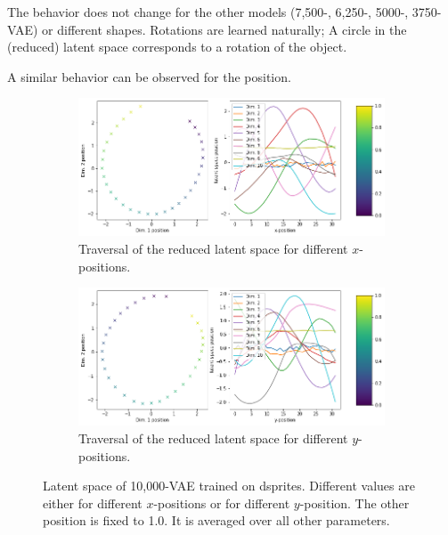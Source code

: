 The behavior does not change for the other models (7,500-, 6,250-, 5000-, 3750-\ac{VAE}) or different shapes.
Rotations are learned naturally;
A circle in the (reduced) latent space corresponds to a rotation of the object.

A similar behavior can be observed for the position.
\begin{figure}
    \centering
    \begin{subfigure}{.48\textwidth}
        \includegraphics[width=\textwidth]{images/latent_space_traversals/vae_10000_dsprites_latent_space_values_x_position.png}
        \caption{Traversal of the reduced latent space for different $x$-positions.}
        \label{subfig:vae_dsprites_x_pos_latent_space_route}
    \end{subfigure}
    \begin{subfigure}{.48\textwidth}
        \includegraphics[width=\textwidth]{images/latent_space_traversals/vae_10000_dsprites_latent_space_values_y_position.png}
        \caption{Traversal of the reduced latent space for different $y$-positions.}
        \label{subfig:vae_dsprites_y_pos_latent_space_route}
    \end{subfigure}
    \caption[VAE on dsprites: Latent Space Values]{Latent space of 10,000-VAE trained on dsprites. Different values are either for different $x$-positions or for different $y$-position. The other position is fixed to 1.0. It is averaged over all other parameters.}
    \label{fig:vae_dsprites_latent_space_x_position}
\end{figure}

